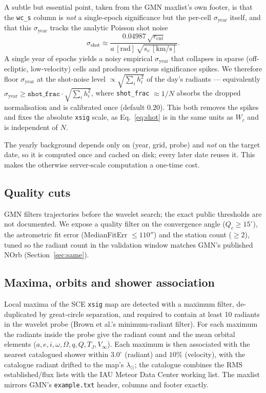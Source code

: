 \documentclass[11pt]{article}
\begin{document}
A subtle but essential point, taken from the GMN maxlist's own footer, is that the
\texttt{wc\_s} column is \emph{not} a single-epoch significance but the per-cell
$\sigma_\mathrm{year}$ itself, and that this $\sigma_\mathrm{year}$ tracks the
analytic Poisson shot noise
\begin{equation}
\sigma_\mathrm{shot} \approx \frac{0.04987\,\sqrt{r_\mathrm{cnt}}}{a\,[\mathrm{rad}]\,\sqrt{s_v\,[\mathrm{km/s}]}} .
\label{eq:shot}
\end{equation}
A single year of epochs yields a noisy empirical $\sigma_\mathrm{year}$ that
collapses in sparse (off-ecliptic, low-velocity) cells and produces spurious
significance spikes. We therefore floor $\sigma_\mathrm{year}$ at the
shot-noise level $\propto \sqrt{\sum_i h_i^2}$ of the day's radiants ---
equivalently $\sigma_\mathrm{year} \ge \texttt{shot\_frac}\cdot\sqrt{\sum_i h_i^2}$,
where \texttt{shot\_frac} $\approx 1/N$ absorbs the dropped normalisation and is
calibrated once (default $0.20$). This both removes the spikes and fixes the
absolute \texttt{xsig} scale, as Eq.~\eqref{eq:shot} is in the same units as
$W_c$ and is independent of $N$.

The yearly background depends only on (year, grid, probe) and \emph{not} on the
target date, so it is computed once and cached on disk; every later date reuses
it. This makes the otherwise server-scale computation a one-time cost.

\subsection{Quality cuts}
GMN filters trajectories before the wavelet search; the exact public thresholds
are not documented. We expose a quality filter on the convergence angle
($Q_c \ge 15^\circ$), the astrometric fit error (MedianFitErr $\le 110''$) and
the station count ($\ge 2$), tuned so the radiant count in the validation window
matches GMN's published NOrb (Section~\ref{sec:same}).

\subsection{Maxima, orbits and shower association}
Local maxima of the SCE \texttt{xsig} map are detected with a maximum filter,
de-duplicated by great-circle separation, and required to contain at least 10
radiants in the wavelet probe (Brown et al.'s minimum-radiant filter). For each
maximum the radiants inside the probe give the radiant count and the mean orbital
elements ($a,e,i,\omega,\Omega,q,Q,T_J,V_\infty$). Each maximum is then associated
with the nearest catalogued shower within $3.0^\circ$ (radiant) and $10\%$
(velocity), with the catalogue radiant drifted to the map's $\lambda_\odot$; the
catalogue combines the RMS established/flux lists with the IAU Meteor Data Center
working list. The maxlist mirrors GMN's \texttt{example.txt} header, columns and
footer exactly.
\end{document}
